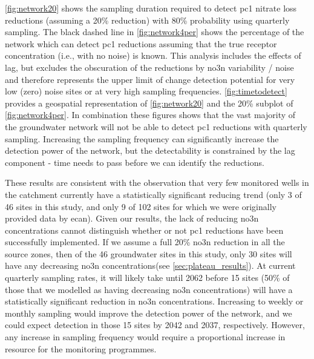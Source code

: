 \autoref{fig:network20} shows the sampling duration required to detect \gls{pc1} nitrate loss reductions (assuming a 20\% reduction) with 80\% probability using quarterly sampling.
The black dashed line in \autoref{fig:network4per} shows the percentage of the network which can detect \gls{pc1} reductions assuming that the true receptor concentration (i.e., with no noise) is known.
This analysis includes the effects of lag, but excludes the obscuration of the reductions by \gls{no3n} variability / noise and therefore represents the upper limit of change detection potential for very low (zero) noise sites or at very high sampling frequencies.
\autoref{fig:timetodetect} provides a geospatial representation of \autoref{fig:network20} and the 20\% subplot of \autoref{fig:network4per}.
In combination these figures shows that the vast majority of the groundwater network will not be able to detect \gls{pc1} reductions with quarterly sampling.
Increasing the sampling frequency can significantly increase the detection power of the network, but the detectability is constrained by the lag component - time needs to pass before we can identify the reductions.

These results are consistent with the observation that very few monitored wells in the catchment currently have a statistically significant reducing trend (only 3 of 46 sites in this study, and only 9 of 102 sites for which we were originally provided data by \gls{ecan}).
Given our results, the lack of reducing \gls{no3n} concentrations cannot distinguish whether or not \gls{pc1} reductions have been successfully implemented.
If we assume a full 20\% \gls{no3n} reduction in all the source zones, then of the 46 groundwater sites in this study, only 30 sites will have any decreasing \gls{no3n} concentrations(see \autoref{sec:plateau_results}).
At current quarterly sampling rates, it will likely take until 2062 before 15 sites (50\% of those that we modelled as having decreasing \gls{no3n} concentrations) will have a statistically significant reduction in \gls{no3n} concentrations.
Increasing to weekly or monthly sampling would improve the detection power of the network, and we could expect detection in those 15 sites by 2042 and 2037, respectively.
However, any increase in sampling frequency would require a proportional increase in resource for the monitoring programmes.

